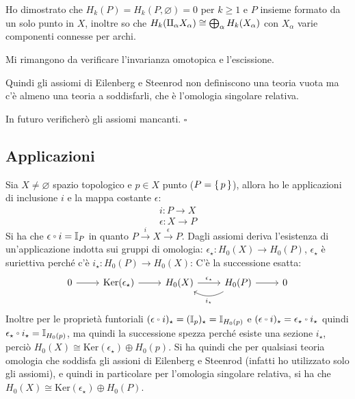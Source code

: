\documentclass[10pt, twoside=false, x11names]{scrbook}
\newenvironment{proof}{{\textbf{Dimostrazione}:}}{\hfill $\square$}
\renewcommand{\ker}[1]{\mathrm{Ker}( #1)}
\newcommand{\Id}[1][]{\mathbb{I}_#1}
\newcommand{\invamalg}{\mathbin{\text{\rotatebox[origin=c]{180}{$\Pi$}}}}
\let\latexcirc=\circ
\newcommand{\ccirc}{\mathbin{\mathchoice
  {\xcirc\scriptstyle}
  {\xcirc\scriptstyle}
  {\xcirc\scriptscriptstyle}
  {\xcirc\scriptscriptstyle}
}}
\newcommand{\xcirc}[1]{\vcenter{\hbox{$#1\latexcirc$}}}
\let\circ\ccirc
\let\emptyset\varnothing
\begin{document}
\begin{proof}
  Ho dimostrato che $ H_k(P) = H_k(P, \emptyset) = 0 $ per $ k \geq 1 $ e $ P $ insieme
  formato da un solo punto in $ X $,
  inoltre so che $ H_k (\invamalg_\alpha X_\alpha) \cong \bigoplus_\alpha H_k(X_\alpha) $ con $ X_\alpha $
  varie componenti connesse per archi.

  Mi rimangono da verificare l'invarianza omotopica e l'escissione.

  Quindi gli assiomi di Eilenberg e Steenrod non definiscono una teoria
  vuota ma c'è almeno una teoria a soddisfarli, che è l'omologia singolare
  relativa.

  In futuro verificherò gli assiomi mancanti.
\end{proof}
\subsection{Applicazioni}

Sia $ X \not = \emptyset $ spazio topologico e $ p \in X $ punto ($ P = \set{p} $), allora ho le
applicazioni di inclusione $ i $ e la mappa costante $ \epsilon $:
\begin{gather*}
  i \colon P \to X \\
  \epsilon \colon X \to P
\end{gather*}
Si ha che $ \epsilon \circ i = \Id{P} $ in quanto $ P \overset{i}{\to} X \overset{\epsilon}{\to} P $.
Dagli assiomi deriva l'esistenza di un'applicazione indotta
sui gruppi di omologia: $ \epsilon_\star \colon H_0(X) \to H_0(P) $,
$ \epsilon_\star $ è suriettiva perché c'è $ i_\star \colon H_0(P) \to H_0(X) $:
C'è la successione esatta:
\[
  \begin{tikzcd}
    0 \arrow{r}{} & \ker{\epsilon_\star} \arrow{r}{} & H_0(X) \arrow{r}{\epsilon_\star} & \arrow[bend left]{l}{i_\star} H_0(P) \arrow{r}{} & 0
  \end{tikzcd}
\]
Inoltre per le proprietà funtoriali $ (\epsilon \circ i)_\star = (\Id{p})_\star = \Id{H_0(p)} $
e $ (\epsilon \circ i)_\star = \epsilon_\star \circ i_\star $ quindi $ \epsilon_\star \circ i_\star = \Id{H_0(p)} $, ma quindi
la successione spezza perché esiste una sezione $ i_\star $, perciò $ H_0(X) \cong \ker{\epsilon_\star} \oplus H_0(p) $.
Si ha quindi che per qualsiasi teoria omologia che soddisfa gli assioni di Eilenberg
e Steenrod (infatti ho utilizzato solo gli assiomi),
e quindi in particolare per l'omologia singolare relativa,
si ha che $ H_0(X) \cong \ker{\epsilon_\star} \oplus H_0(P) $.
\end{document}
